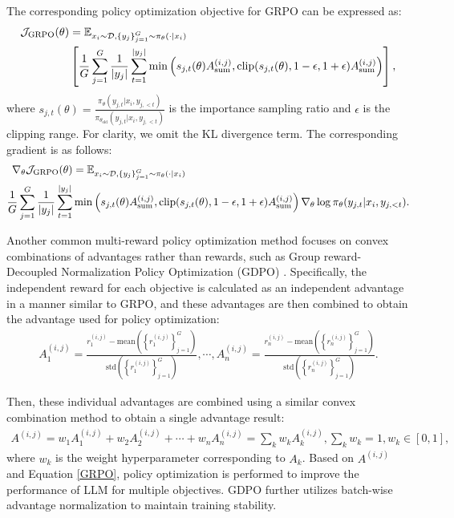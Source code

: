 The corresponding policy optimization objective for GRPO can be expressed as:
\begin{align}
    \mathcal{J}_\text{GRPO}(\theta) &= \mathbb{E}_{x_i \sim \mathcal{D},\left\{y_j\right\}_{j=1}^G \sim \pi_\theta(\cdot | x_i)} \notag \\ &\left[ \frac{1}{G} \sum_{j=1}^G \frac{1}{|y_j|} \sum_{t=1}^{|y_j|} \min \left( s_{j,t}(\theta) A_\text{sum}^{(i,j)}, \text{clip}(s_{j,t}(\theta), 1 - \epsilon, 1+\epsilon)A_\text{sum}^{(i,j)} \right) \right],\label{GRPO}
\end{align}
where $s_{j,t}(\theta) = \frac{\pi_\theta (y_{j,t} | x_i, y_{j, <t})}{\pi_{\theta_\text{old}} (y_{j,t} | x_i, y_{j, <t})}$ is the importance sampling ratio and $\epsilon$ is the clipping range. For clarity, we omit the KL divergence term. The corresponding gradient is as follows:
\begin{align}
    \nabla_\theta \mathcal{J}_\text{GRPO}(\theta) &= \mathbb{E}_{x_i \sim \mathcal{D},\left\{y_j\right\}_{j=1}^G \sim \pi_\theta(\cdot | x_i)} \notag \\ \frac{1}{G} \sum_{j=1}^G \frac{1}{|y_j|} \sum_{t=1}^{|y_j|} & \min \left( s_{j,t}(\theta) A_\text{sum}^{(i,j)}, \text{clip}(s_{j,t}(\theta), 1 - \epsilon, 1+\epsilon)A_\text{sum}^{(i,j)} \right) \nabla_\theta \log \pi_\theta (y_{j,t} | x_i, y_{j, <t}).\label{GRPO_gradient}
\end{align}

Another common multi-reward policy optimization method focuses on convex combinations of advantages rather than rewards, such as Group reward-Decoupled Normalization Policy Optimization (GDPO) \citep{gdpo}. Specifically, the independent reward for each objective is calculated as an independent advantage in a manner similar to GRPO, and these advantages are then combined to obtain the advantage used for policy optimization: 
\begin{align}
    A_1^{(i,j)} = \frac{r_1^{(i,j)} - \text{mean} \left(\left\{ r_1^{(i,j)} \right\}_{j=1}^G\right)}{\text{std} \left(\left\{ r_1^{(i,j)} \right\}_{j=1}^G\right)}, \cdots, A_n^{(i,j)} = \frac{r_n^{(i,j)} - \text{mean} \left(\left\{ r_n^{(i,j)} \right\}_{j=1}^G\right)}{\text{std} \left(\left\{ r_n^{(i,j)} \right\}_{j=1}^G\right)}.\label{advantage_combination}
\end{align}

Then, these individual advantages are combined using a similar convex combination method to obtain a single advantage result:
\begin{align}
    A^{(i,j)} = w_1A_1^{(i,j)} + w_2A_2^{(i,j)} + \cdots + w_nA_n^{(i,j)} = \sum_{k} w_k A_k^{(i,j)}, \sum_k w_k = 1, w_k \in [0, 1],\label{advantage_convex}
\end{align}
where $w_k$ is the weight hyperparameter corresponding to $A_k$. Based on $A^{(i,j)}$ and Equation \ref{GRPO}, policy optimization is performed to improve the performance of LLM for multiple objectives. GDPO further utilizes batch-wise advantage normalization to maintain training stability.

